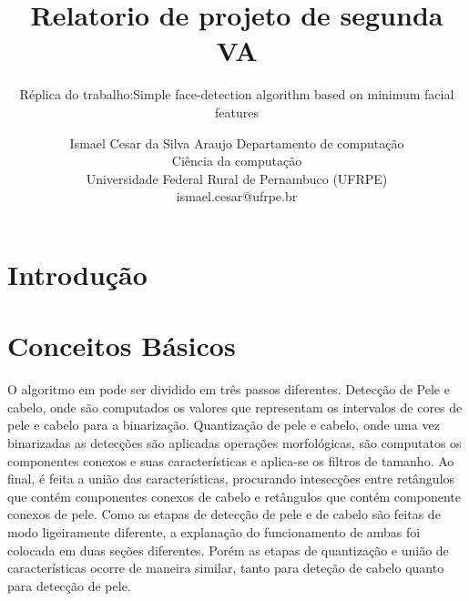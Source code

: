 \documentclass[journal,onecolumn]{IEEEtran}
\title{Relatorio de projeto de segunda VA}
\subtitle{Réplica do trabalho:Simple face-detection algorithm based on minimum facial features}
\author{		Ismael Cesar da Silva Araujo
  				Departamento de computação \\
				  Ciência da computação\\
		Universidade Federal Rural de Pernambuco (UFRPE)\\
			ismael.cesar@ufrpe.br}
\date{}
\begin{document}
\maketitle

\section{Introdução}

\section{Conceitos Básicos}
	O algoritmo em \cite{chen2007simple} pode ser dividido em três passos diferentes. 
	Detecção de Pele e cabelo, onde são computados os valores que representam os intervalos de cores de pele e cabelo para a binarização. 
	Quantização de pele e cabelo, onde uma vez binarizadas as detecções são aplicadas operações morfológicas, são computatos os componentes conexos e suas características e aplica-se os filtros de tamanho.
	Ao final, é feita a união das características, procurando intesecções entre retângulos que contém componentes conexos de cabelo e retângulos que contém componente conexos de pele.
	Como as etapas de detecção de pele e de cabelo são feitas de modo ligeiramente diferente, a explanação do funcionamento de ambas foi colocada em duas seções diferentes.
	Porém as etapas de quantização e união de características ocorre de maneira similar, tanto para deteção de cabelo quanto para detecção de pele.
	
\end{document}
